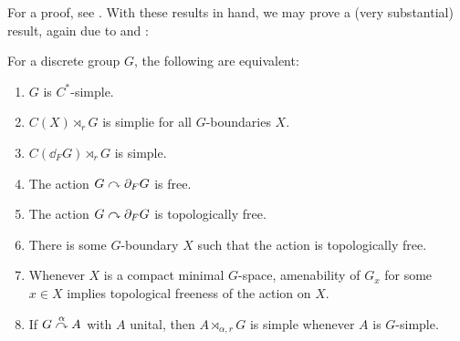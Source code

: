 For a proof, see \cite[lemma 11]{ozawa2014lecture}. With these results in hand, we may prove a (very substantial) result, again due to \cite{breuillard2017c} and \cite{kalantar2017boundaries}:
\begin{theorem}
	For a discrete group $G$, the following are equivalent:
\begin{enumerate}
		\item $G$ is $C^*$-simple.
		\item $C(X) \rtimes_r G$ is simplie for all $G$-boundaries $X$.
		\item $C(\dd_F G) \rtimes_r G$ is simple.
		\item The action $G \stackrel{}{\curvearrowright} \partial_F G$ is free.
		\item The action $G \stackrel{}{\curvearrowright} \partial_F G$ is topologically free.
		\item There is some $G$-boundary $X$ such that the action is topologically free.
		\item Whenever $X$ is a compact minimal $G$-space, amenability of $G_x$ for some $x \in X$ implies topological freeness of the action on $X$.
		\item If $G \stackrel{\alpha}{\curvearrowright} A$ with $A$ unital, then $A \rtimes_{\alpha,r} G$ is simple whenever $A$ is $G$-simple.
	\end{enumerate}
	\label{breulcsimple}
\end{theorem}
